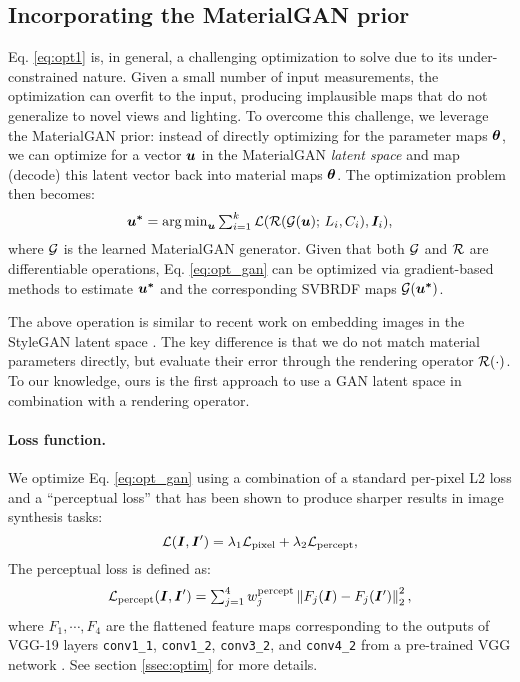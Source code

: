 \subsection{Incorporating the MaterialGAN prior}

Eq. \eqref{eq:opt1} is, in general, a challenging optimization to solve due to its under-constrained nature.
Given a small number of input measurements, the optimization can overfit to the input, producing implausible maps that do not generalize to novel views and lighting.
To overcome this challenge, we leverage the MaterialGAN prior: instead of directly optimizing for the parameter maps $\bm{\theta}$,  we can optimize for a vector $\bm{u}$ in the MaterialGAN \emph{latent space} and map (decode) this latent vector back into material maps $\bm{\theta}$.
The optimization problem then becomes:
\begin{equation}
	\label{eq:opt_gan}
	\bm{u^{*}} = \textstyle\operatorname*{arg\,min}_{\bm{u}} \sum_{i=1}^k \mathcal{L}(\mathcal{R}(\mathcal{G}(\bm{u}); \,L_i, C_i), \bm{I}_i),
\end{equation}
where $\mathcal{G}$ is the learned MaterialGAN generator.
Given that both $\mathcal{G}$ and $\mathcal{R}$ are differentiable operations, Eq. \eqref{eq:opt_gan} can be optimized via gradient-based methods to estimate $\bm{u^{*}}$ and the corresponding SVBRDF maps $\mathcal{G}(\bm{u^{*}})$.

The above operation is similar to recent work on embedding images in the StyleGAN latent space \cite{Abdal19a,Abdal19b}.
The key difference is that we do not match material parameters directly, but evaluate their error through the rendering operator $\mathcal{R}(\cdot)$.
To our knowledge, ours is the first approach to use a GAN latent space in combination with a rendering operator.


\paragraph{Loss function.}
We optimize Eq. \ref{eq:opt_gan} using a combination of a standard per-pixel L2 loss and a ``perceptual loss'' \cite{Johnson2016} that has been shown to produce sharper results in image synthesis tasks:
\begin{equation}
	\label{eq:loss}
	\mathcal{L}(\bm{I}, \bm{I}') = \lambda_1 \mathcal{L}_\mathrm{pixel} + \lambda_2 \mathcal{L}_\mathrm{percept},
\end{equation}
The perceptual loss is defined as:
\begin{equation}
	\mathcal{L}_\mathrm{percept}(\bm{I}, \bm{I}') = \textstyle\sum_{j=1}^4 w^\mathrm{percept}_j \left\|F_j(\bm{I}) - F_j(\bm{I}')\right\|_2^2,
\end{equation}
where $F_1, \cdots, F_4$ are the flattened feature maps corresponding to the outputs of VGG-19 layers  \texttt{conv1\_1}, \texttt{conv1\_2}, \texttt{conv3\_2}, and \texttt{conv4\_2} from a pre-trained VGG network \cite{VGG}. See section \ref{ssec:optim} for more details.



